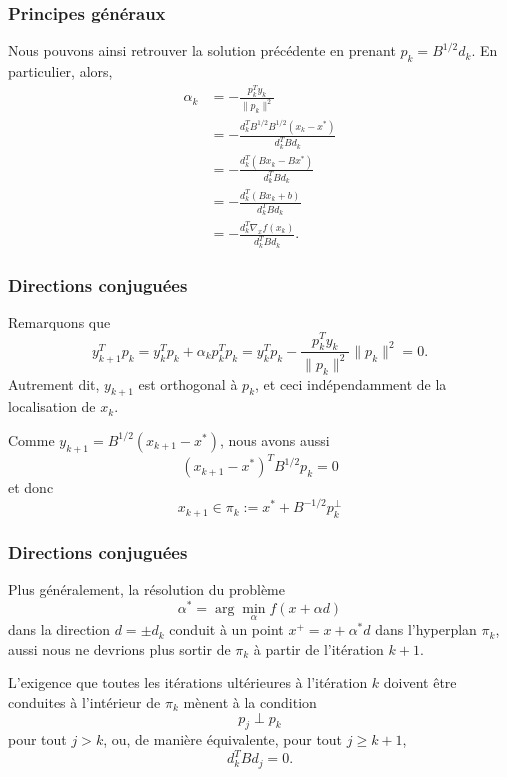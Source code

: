 \documentclass[usepdftitle=false,aspectratio=169]{beamer}
\begin{document}
\begin{frame}
\frametitle{Principes généraux}


Nous pouvons ainsi retrouver la solution précédente en prenant $p_k = B^{1/2} d_k$. En particulier, alors,
\begin{align*}
\alpha_k &= -\frac{p_k^T y_k}{\| p_k \|^2} \\
&= -\frac{d_k^T B^{1/2} B^{1/2}(x_k-x^*) }{d_k^TBd_k} \\
&= -\frac{d_k^T (Bx_k-Bx^*) }{d_k^TBd_k} \\
&= -\frac{d_k^T (Bx_k+b) }{d_k^TBd_k} \\
&= -\frac{d_k^T \nabla_x f(x_k) }{d_k^TBd_k}.
\end{align*}


\end{frame}

\begin{frame}
\frametitle{Directions conjuguées}

Remarquons que
$$
y_{k+1}^T p_k = y_k^Tp_k + \alpha_k p_k^T p_k
= y_k^Tp_k -\frac{p_k^T y_k}{\| p_k \|^2} \| p_k \|^2 = 0.
$$
Autrement dit, $y_{k+1}$ est orthogonal à $p_k$, et ceci indépendamment de la localisation de $x_k$.

\mbox{}

Comme $y_{k+1} = B^{1/2}(x_{k+1}-x^*)$, nous avons aussi
$$
(x_{k+1}-x^*)^TB^{1/2} p_k = 0
$$
et donc
$$
x_{k+1} \in \pi_k := x^* + B^{-1/2} p_k^{\perp}
$$

\end{frame}

\begin{frame}
\frametitle{Directions conjuguées}

Plus généralement, la résolution du problème
$$
\alpha^* = \arg \min_{\alpha} f (x + \alpha d)
$$
dans la direction $d = \pm d_k$ conduit à un point $x^+ = x + \alpha^* d$ dans l'hyperplan $\pi_k$, aussi nous ne devrions plus sortir de $\pi_k$ à partir de l'itération $k+1$.

\mbox{}

L'exigence que toutes les itérations ultérieures à l'itération $k$ doivent être conduites à l'intérieur de $\pi_k$ mènent à la condition
$$
p_j \perp p_k
$$
pour tout $j > k$, ou, de manière équivalente, pour tout $j \geq k + 1$,
$$
d^T_k B d_j = 0.
$$

\end{frame}
\end{document}

